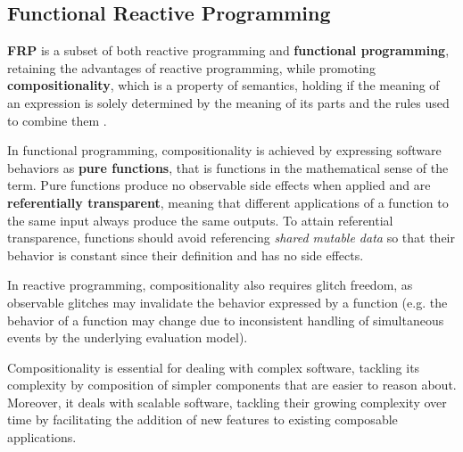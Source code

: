 
\subsection{Functional Reactive Programming}

\textbf{\ac{FRP}} is a subset of both reactive programming and
\textbf{functional programming}, retaining the advantages of reactive
programming, while promoting \textbf{compositionality}, which is a
property of semantics, holding if the meaning of an expression is solely
determined by the meaning of its parts and the rules used to combine them
\cite{FRP}.

In functional programming, compositionality is achieved by expressing software
behaviors as \textbf{pure functions}, that is functions in the mathematical
sense of the term. Pure functions produce no observable side effects when
applied and are \textbf{referentially transparent}, meaning that different
applications of a function to the same input always produce the same outputs.
To attain referential transparence, functions should avoid referencing
\textit{shared mutable data} so that their behavior is constant since their
definition and has no side effects.

In reactive programming, compositionality also requires glitch freedom, as
observable glitches may invalidate the behavior expressed by a function (e.g.
the behavior of a function may change due to inconsistent handling of
simultaneous events by the underlying evaluation model).

Compositionality is essential for dealing with complex software, tackling its
complexity by composition of simpler components that are easier to reason
about. Moreover, it deals with scalable software, tackling their growing
complexity over time by facilitating the addition of new features to existing
composable applications.
